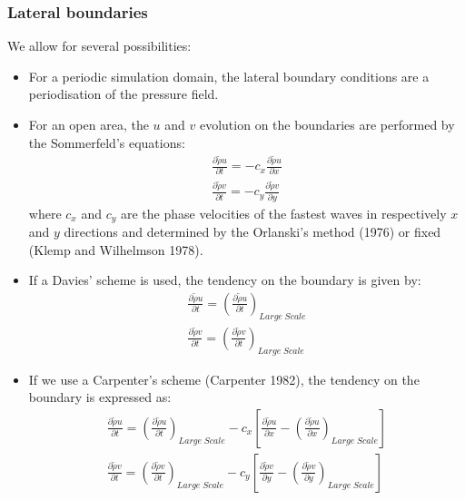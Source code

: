 \subsubsection{Lateral boundaries}
We allow for several possibilities:
\begin{itemize}

\item For a periodic simulation domain, the lateral boundary conditions are
a periodisation of the pressure field.
\item For an open area, the ${ u }$ and ${ v }$ evolution on the boundaries
are performed by the Sommerfeld's equations:
\begin{eqnarray}
\label{som1}
\frac {\partial{\tilde{\rho} { u }} } {\partial{t} } = -  c_x \frac
{\partial{\tilde{\rho} { u }} } {\partial{x} } \\
\label{som2}
\frac {\partial{\tilde{\rho} { v }} } {\partial{t} } = -  c_y \frac
{\partial{\tilde{\rho} { v }} } {\partial{y} }
\end{eqnarray}
where $c_x$ and $c_y$ are the phase velocities
of the fastest waves in  respectively $x$ and $y$ directions and determined
by the Orlanski's method (1976) or fixed (Klemp and Wilhelmson 1978).\\
\item If a Davies' scheme is used, the tendency on the boundary is given by:\\
\begin{eqnarray}
\frac {\partial{\tilde{\rho} { u }} } {\partial{t} } =
\left( \frac {\partial{\tilde{\rho} { u }} } {\partial{t} } \right)_{Large
\; Scale} \\
\frac {\partial{\tilde{\rho} { v }} } {\partial{t} } =
\left( \frac {\partial{\tilde{\rho} { v }} } {\partial{t} } \right)_{Large
\; Scale}
\end{eqnarray}
\item If we use a Carpenter's scheme (Carpenter 1982),
the tendency on the boundary is expressed as:
\begin{eqnarray}
\frac {\partial{\tilde{\rho} { u }} } {\partial{t} } =
\left( \frac {\partial{\tilde{\rho} { u }} } {\partial{t} } \right)_{Large
\; Scale}-  c_x  \left[
 \frac {\partial{\tilde{\rho} { u }} } {\partial{x} }
- \left( \frac {\partial{\tilde{\rho} { u }} } {\partial{x} }\right)_{Large
\; Scale}
\right]\\
%
\frac {\partial{\tilde{\rho} { v }} } {\partial{t} } =
\left( \frac {\partial{\tilde{\rho} { v }} } {\partial{t} } \right)_{Large
\; Scale} -  c_y \left[
 \frac {\partial{\tilde{\rho} { v }} } {\partial{y} }
- \left( \frac {\partial{\tilde{\rho} { v }} } {\partial{y} }\right)_{Large
\; Scale}
\right]
\end{eqnarray}
\end{itemize}

